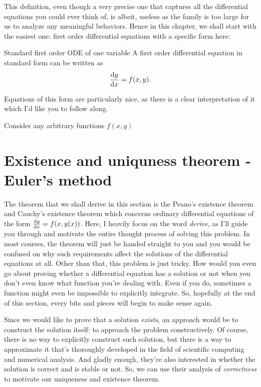 This definition, even though a very precise one that captures all the differential
equations you could ever think of, is albeit, useless as the family is too large for
us to analyze any meaningful behaviors. Hence in this chapter, we shall start with the
easiest one: first order differential equations with a specific form here:

\begin{df}{Standard first order ODE of one variable}
  A first order differential equation in standard form can be written as
  \begin{equation}
    \odv{y}{x} = f(x, y).
  \end{equation}
\end{df}

Equations of this form are particularly nice, as there is a clear interpretation of it
which I'd like you to follow along.

Consider any arbitrary functions \(f(x, y)\)

\section{Existence and uniquness theorem - Euler's method}

The theorem that we shall derive in this section is the Peano's existence theorem and
Cauchy's existence theorem which concerns ordinary differential equations of the form
\(\odv{y}{x} = f(x, y(x))\). Here, I heavily focus on the word \emph{derive}, as I'll
guide you through and motivate the entire thought process of solving this problem. In
most courses, the theorem will just be handed straight to you and you would be confused
on why such requirements affect the solutions of the differential equations at all. Other
than that, this problem is just tricky. How would you even go about proving whether a
differential equation has a solution or not when you don't even know what function you're
dealing with. Even if you do, sometimes a function might even be impossible to explicitly integrate.
So, hopefully at the end of this section, every bits and pieces will begin to make sense again.

Since we would like to prove that a solution \emph{exists}, an approach would be to construct
the solution itself: to approach the problem constructively. Of course, there is no way
to explicitly construct such solution, but there is a way to approximate it that's thoroughly
developed in the field of scientific computing and numerical analysis. And gladly enough,
they're also interested in whether the solution is correct and is stable or not. So,
we can use their analysis of \emph{correctness} to motivate our uniqueness and existence theorem.

